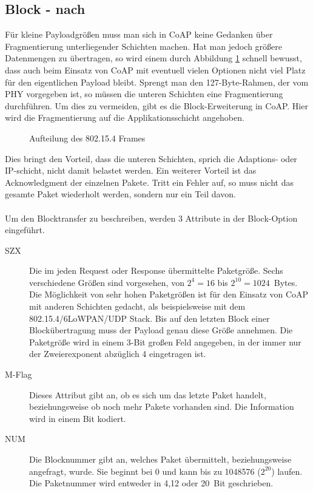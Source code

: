 \subsection{Block - nach \cite{draft-ietf-core-block-10}}
Für kleine Payloadgrößen muss man sich in \ac{CoAP} keine Gedanken über
Fragmentierung unterliegender Schichten machen. Hat man jedoch größere
Datenmengen zu übertragen, so wird einem durch Abbildung \ref{table:FramePayload}
schnell bewusst, dass auch beim Einsatz von \ac{CoAP} mit eventuell vielen Optionen nicht viel
Platz für den eigentlichen Payload bleibt. Sprengt man den 127-Byte-Rahmen, der vom
\ac{PHY} vorgegeben ist, so müssen die unteren Schichten eine
Fragmentierung durchführen. Um dies zu vermeiden, gibt es die Block-Erweiterung
in \ac{CoAP}. Hier wird die Fragmentierung auf die Applikationsschicht angehoben.
\begin{figure}[htbp]
    \centering
    \begin{minipage}{.61\textwidth}
    
    \caption{Aufteilung des 802.15.4 Frames}
    \end{minipage}
    \label{table:FramePayload}
\end{figure}
Dies bringt den Vorteil, dass die unteren Schichten, sprich die Adaptions- oder \ac{IP}-schicht,
nicht damit belastet werden. Ein weiterer Vorteil ist das Acknowledgment der
einzelnen Pakete. Tritt ein Fehler auf, so muss nicht das gesamte Paket
wiederholt werden, sondern nur ein Teil davon.\\\\
Um den Blocktransfer zu beschreiben, werden 3 Attribute in der Block-Option
eingeführt.
\begin{description}
 \item[SZX] 
 Die im jeden Request oder Response übermittelte Paketgröße. Sechs verschiedene
 Größen sind vorgesehen, von $2^4=16$ bis $2^{10}=1024$~Bytes. Die Möglichkeit
 von sehr hohen Paketgrößen ist für den Einsatz von \ac{CoAP} mit anderen Schichten
 gedacht, als beispielsweise mit dem 802.15.4/\ac{6LoWPAN}/\ac{UDP} Stack. Bis auf den 
 letzten Block einer Blockübertragung muss der Payload genau diese Größe annehmen.
 Die Paketgröße wird in einem 3-Bit großen Feld angegeben, in der immer nur der 
 Zweierexponent abzüglich 4 eingetragen ist.
 \item[M-Flag] Dieses Attribut gibt an, ob es sich um das letzte Paket handelt, beziehungsweise
 ob noch mehr Pakete vorhanden sind. Die Information wird in einem Bit kodiert. 
\item[NUM] Die Blocknummer gibt an, welches Paket übermittelt, beziehungsweise angefragt,
 wurde. Sie beginnt bei 0 und kann bis zu 1048576 ($2^{20}$) laufen. Die
 Paketnummer wird entweder in 4,12 oder 20~Bit geschrieben.
\end{description}

